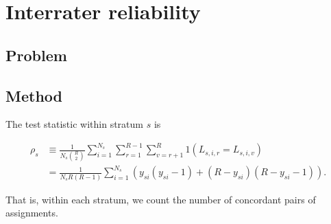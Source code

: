 \section{Interrater reliability}

\subsection{Problem}

\cite{davies1982measuring, mchugh2012interrater}

\subsection{Method}

The test statistic within stratum $s$ is

\begin{align*}
\rho_s &\equiv \frac{1}{N_s {R \choose 2}} \sum_{i=1}^{N_s}
              \sum_{r=1}^{R-1} \sum_{v=r+1}^R 1(L_{s,i,r} = L_{s,i,v}) \\
       &= \frac{1}{N_s R(R-1)} \sum_{i=1}^{N_s}
                (y_{si}(y_{si}-1) + (R-y_{si})(R-y_{si}-1)).
\end{align*}

That is, within each stratum, we count the number of concordant pairs of
assignments.

